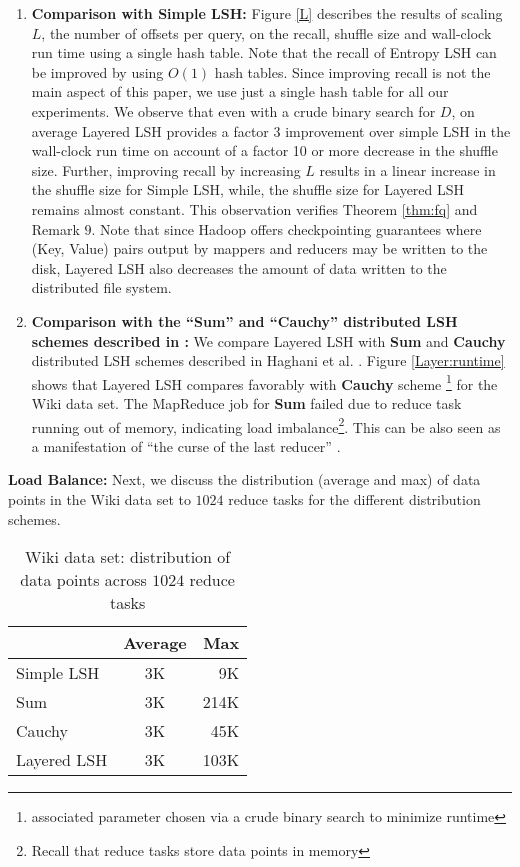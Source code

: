 \documentclass{acm_proc_article-sp}
\numberwithin{equation}{section}
\numberwithin{figure}{section}
\begin{document}
\begin{enumerate}
\item{\bf Comparison with Simple LSH:} 
Figure \ref{L} describes the results of scaling $L$, the number of offsets per query, on the recall, shuffle size and wall-clock run time using a single hash table. Note that the recall of Entropy LSH can be improved by using $O(1)$ hash tables. Since improving recall is not the main aspect of this paper, we use just a single hash table for all our experiments. We observe that even with a crude binary search for $D$, on average Layered LSH provides a factor 3 improvement over simple LSH in the wall-clock run time on account of a factor 10 or more decrease in the shuffle size. Further, improving recall by increasing $L$ results in a linear increase in the shuffle size for Simple LSH, while, the shuffle size for Layered LSH remains almost constant. This observation verifies Theorem \ref{thm:fq} and Remark $9$. Note that since Hadoop offers checkpointing guarantees where (Key, Value) pairs output by mappers and reducers may be written to the disk, Layered LSH also decreases the amount of data written to the distributed file system. 

\item{\bf Comparison with the ``Sum'' and ``Cauchy'' distributed LSH schemes described in \cite{Haghani}:}
We compare Layered LSH with {\bf Sum} and {\bf Cauchy} distributed LSH schemes described in Haghani et al. \cite{Haghani}. Figure \ref{Layer:runtime} shows that Layered LSH compares favorably with {\bf Cauchy} scheme \footnote{associated parameter chosen via a crude binary search to minimize runtime} for the Wiki data set. The MapReduce job for {\bf Sum} failed due to reduce task running out of memory, indicating load imbalance\footnote{Recall that reduce tasks store data points in memory}. This can be also seen as a manifestation of ``the curse of the last reducer'' \cite{curselast}.

\end{enumerate} 

{\bf Load Balance:}
Next, we discuss the distribution (average and max) of data points in the Wiki data set to $1024$ reduce tasks for the different distribution schemes. 

\begin{table}
	\begin{center}
\begin{tabular}{ l | c | r }
   & Average & Max \\
  \hline                        
  Simple LSH & 3K & 9K \\
  Sum & 3K & 214K \\
  Cauchy & 3K & 45K \\
  Layered LSH & 3K & 103K \\
\end{tabular}
\caption{Wiki data set: distribution of data points across $1024$ reduce tasks}
\label{table:lb}
\end{center}
\end{table}
\end{document}
